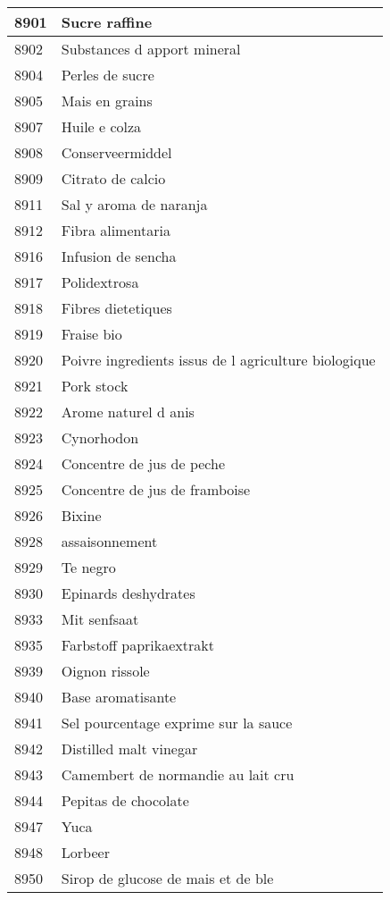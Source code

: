 \begin{longtable}{|l|l|}
8901 & Sucre raffine \\ \hline 
8902 & Substances d apport mineral \\ \hline 
8904 & Perles de sucre \\ \hline 
8905 & Mais en grains \\ \hline 
8907 & Huile e colza \\ \hline 
8908 & Conserveermiddel \\ \hline 
8909 & Citrato de calcio \\ \hline 
8911 & Sal y aroma de naranja \\ \hline 
8912 & Fibra alimentaria \\ \hline 
8916 & Infusion de sencha \\ \hline 
8917 & Polidextrosa \\ \hline 
8918 & Fibres dietetiques \\ \hline 
8919 & Fraise bio \\ \hline 
8920 & Poivre  ingredients issus de l agriculture biologique \\ \hline 
8921 & Pork stock \\ \hline 
8922 & Arome naturel d anis \\ \hline 
8923 & Cynorhodon \\ \hline 
8924 & Concentre de jus de peche \\ \hline 
8925 & Concentre de jus de framboise \\ \hline 
8926 & Bixine \\ \hline 
8928 & assaisonnement \\ \hline 
8929 & Te negro \\ \hline 
8930 & Epinards deshydrates \\ \hline 
8933 & Mit senfsaat \\ \hline 
8935 & Farbstoff paprikaextrakt \\ \hline 
8939 & Oignon rissole \\ \hline 
8940 & Base aromatisante \\ \hline 
8941 & Sel pourcentage exprime sur la sauce \\ \hline 
8942 & Distilled malt vinegar \\ \hline 
8943 & Camembert de normandie au lait cru \\ \hline 
8944 & Pepitas de chocolate \\ \hline 
8947 & Yuca \\ \hline 
8948 & Lorbeer \\ \hline 
8950 & Sirop de glucose de mais et de ble \\ \hline 

\end{longtable}

